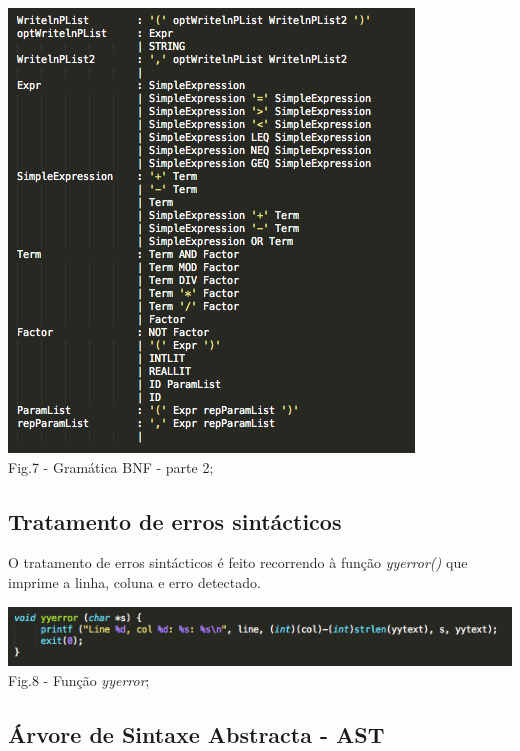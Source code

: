 \documentclass[12pt]{article}
\begin{document}
\newpage

\begin{center}
\includegraphics[scale=1]{bnf_grammar_part2.png}\\
Fig.7 - Gramática BNF - parte 2;
\end{center}

\newpage

\subsection{Tratamento de erros sintácticos}

\indent O tratamento de erros sintácticos é feito recorrendo à função \textit{yyerror()} que imprime a linha, coluna e erro detectado.

\begin{center}
\includegraphics[scale=0.9]{yyerror.png}\\
Fig.8 - Função \textit{yyerror};
\end{center}

\subsection{Árvore de Sintaxe Abstracta - AST}
\end{document}
